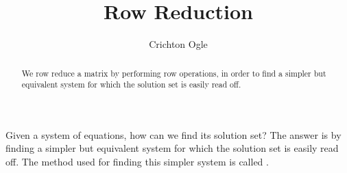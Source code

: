 \documentclass{ximera}
\author{Crichton Ogle}
\title{Row Reduction}
\begin{document}
\begin{abstract}
  We row reduce a matrix by performing row operations, in order to
  find a simpler but equivalent system for which the solution set is
  easily read off.
\end{abstract}
\maketitle

Given a system of equations, how can we find its solution set? The
answer is by finding a simpler but equivalent system for which the
solution set is easily read off. The method used for finding this
simpler system is called .
\end{document}
